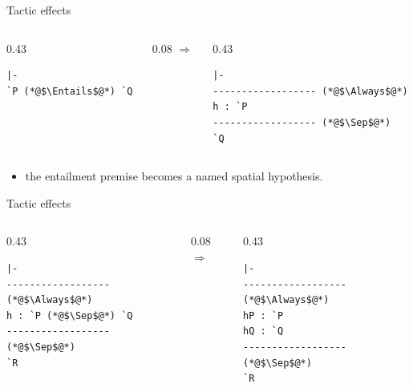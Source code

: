 \documentclass[10pt,aspectratio=169]{beamer}
\begin{document}
\begin{frame}[fragile]{Tactic effects}
  \begin{columns}[c,onlytextwidth]
    \begin{column}{0.43\textwidth}
\begin{lstlisting}[style=leancode]
|-
`P (*@$\Entails$@*) `Q
\end{lstlisting}
    \end{column}
    \begin{column}{0.08\textwidth}
      \centering\Large$\Longrightarrow$
    \end{column}
    \begin{column}{0.43\textwidth}
\begin{lstlisting}[style=leancode]
|-
------------------ (*@$\Always$@*)
h : `P
------------------ (*@$\Sep$@*)
`Q
\end{lstlisting}
    \end{column}
  \end{columns}

  \vfill
  \begin{itemize}
    \item the entailment premise becomes a named spatial hypothesis.
  \end{itemize}
\end{frame}

\begin{frame}[fragile]{Tactic effects}
  \begin{columns}[c,onlytextwidth]
    \begin{column}{0.43\textwidth}
\begin{lstlisting}[style=leancode]
|-
------------------ (*@$\Always$@*)
h : `P (*@$\Sep$@*) `Q
------------------ (*@$\Sep$@*)
`R
\end{lstlisting}
    \end{column}
    \begin{column}{0.08\textwidth}
      \centering\Large$\Longrightarrow$
    \end{column}
    \begin{column}{0.43\textwidth}
\begin{lstlisting}[style=leancode]
|-
------------------ (*@$\Always$@*)
hP : `P
hQ : `Q
------------------ (*@$\Sep$@*)
`R
\end{lstlisting}
    \end{column}
  \end{columns}
\end{frame}
\end{document}
